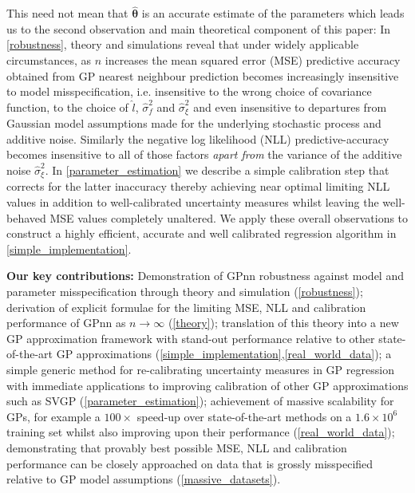 This need not mean that $\hat{\bm{\theta}}$ is an accurate estimate of the parameters which leads us to the second observation and main theoretical component of this paper: In \autoref{robustness}, theory and simulations reveal that under widely applicable circumstances, as $n$ increases the mean squared error (MSE) predictive accuracy obtained from GP nearest neighbour prediction becomes increasingly insensitive to model misspecification, i.e. insensitive to the wrong choice of covariance function, to the choice of $\hat{l}$, $\hat{\sigma}_f^2$ and $\hat{\sigma}_\xi^2$ and even insensitive to departures from Gaussian model assumptions made for the underlying stochastic process and additive noise. Similarly the negative log likelihood (NLL) predictive-accuracy becomes insensitive to all of those factors {\it apart from} the variance of the additive noise $\hat{\sigma}_\xi^2$. In \ref{parameter_estimation} we describe a simple calibration step that corrects for the latter inaccuracy thereby achieving near optimal limiting NLL values in addition to well-calibrated uncertainty measures whilst leaving the well-behaved MSE values completely unaltered. We apply these overall observations to construct a highly efficient, accurate and well calibrated regression algorithm in \autoref{simple_implementation}.



\textbf{Our key contributions:} Demonstration of GPnn robustness against model and parameter misspecification through theory and simulation (\ref{robustness}); derivation of explicit formulae for the limiting MSE, NLL and calibration performance of GPnn as $n \rightarrow \infty$ (\ref{theory}); translation of this theory into a new GP approximation framework with stand-out performance relative to other state-of-the-art GP approximations (\ref{simple_implementation},\ref{real_world_data}); a simple generic method for re-calibrating uncertainty measures in GP regression with immediate applications to improving calibration of other GP approximations such as SVGP (\ref{parameter_estimation}); achievement of massive scalability for GPs, for example a $100 \times$ speed-up over state-of-the-art methods on a $1.6 \times 10^6$  training set whilst also improving upon their performance (\ref{real_world_data}); demonstrating that provably best possible MSE, NLL and calibration performance can be closely approached on data that is grossly misspecified relative to GP model assumptions (\ref{massive_datasets}).



